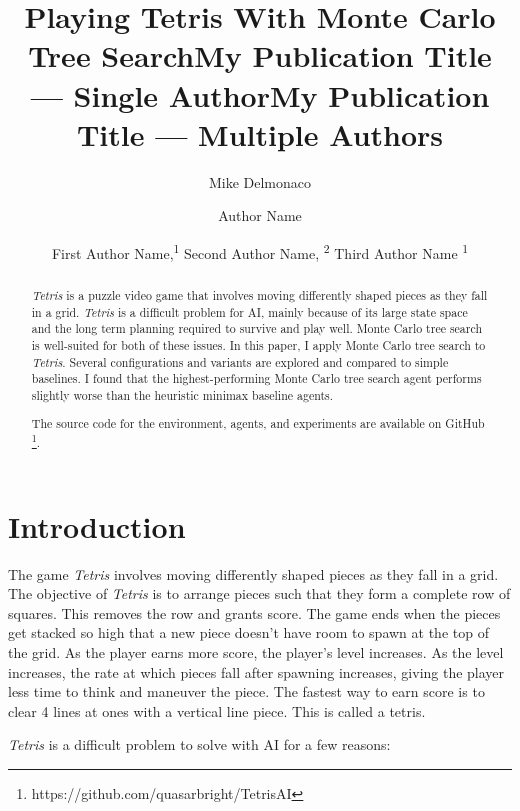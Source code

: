 \documentclass[letterpaper]{article} %
\title{Playing Tetris With Monte Carlo Tree Search}
\author{
    Mike Delmonaco
}
\title{My Publication Title --- Single Author}
\author {
    Author Name
}
\title{My Publication Title --- Multiple Authors}
\author {
    First Author Name,\textsuperscript{\rm 1}
    Second Author Name, \textsuperscript{\rm 2}
    Third Author Name \textsuperscript{\rm 1}
}
\begin{document}
\newcommand{\tetris}{\emph{Tetris}}

\maketitle

\begin{abstract}
  \tetris{} is a puzzle video game that involves moving differently shaped pieces as they fall in a grid.
  \tetris{} is a difficult problem for AI, mainly because of its large state space and the long term planning required to survive and play well.
  Monte Carlo tree search is well-suited for both of these issues. In this paper, I apply Monte Carlo tree search to \tetris. Several configurations and variants are explored and compared to simple baselines.
  I found that the highest-performing Monte Carlo tree search agent performs slightly worse than the heuristic minimax baseline agents.

  The source code for the environment, agents, and experiments are available on GitHub \footnote{https://github.com/quasarbright/TetrisAI}.
\end{abstract}

\section{Introduction}
The game \tetris{} involves moving differently shaped pieces as they fall in a grid.
The objective of \tetris{} is to arrange pieces such that they form a complete row of squares. This removes the row and grants score. The game ends when the pieces get stacked so high that a new piece doesn't have room to spawn at the top of the grid.
As the player earns more score, the player's level increases. As the level increases, the rate at which pieces fall after spawning increases, giving the player less time to think and maneuver the piece.
The fastest way to earn score is to clear 4 lines at ones with a vertical line piece. This is called a tetris.

\tetris{} is a difficult problem to solve with AI for a few reasons:
\end{document}
